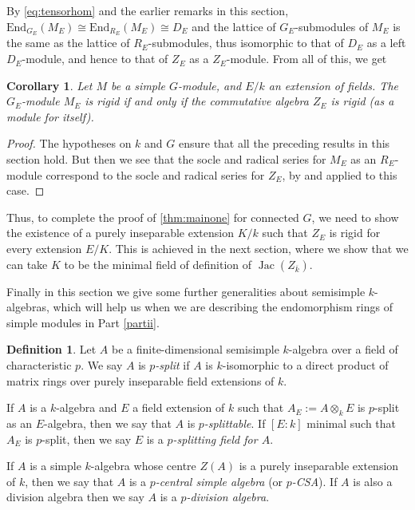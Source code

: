 \documentclass[11pt,reqno]{amsart}
\newtheorem{cor}[lemma]{Corollary}
\theoremstyle{definition}
\theoremstyle{remark}
\theoremstyle{definition}
\newtheorem{defn}[lemma]{Definition}
\theoremstyle{plain}
\DeclareMathOperator{\Jac}{Jac}
\newcommand{\End}{\mathrm{End}}
\newcommand{\bark}{{\overline{k}}}
\begin{document}
By \cref{eq:tensorhom} and the earlier remarks in this section, $\End_{G_E}(M_E)\cong \End_{R_E}(M_E)\cong D_E$ and the lattice of $G_E$-submodules of $M_E$ is the same as the lattice of $R_E$-submodules,  thus isomorphic to that of $D_E$ as a left $D_E$-module, and hence to that of $Z_E$ as a $Z_E$-module.  
From all of this, we get
\begin{cor}\label{cor:GEDE}
Let $M$ be a simple $G$-module, and $E/k$ an extension of fields.
The $G_E$-module $M_E$ is rigid if and only if the commutative algebra $Z_E$ is rigid (as a module for itself). 
\end{cor}

\begin{proof}
The hypotheses on $k$ and $G$ ensure that all the preceding results in this section hold.
But then we see that the socle and radical series for $M_E$ as an $R_E$-module correspond to the socle and radical series for $Z_E$, by  and 
applied to this case.
\end{proof}

Thus, to complete the proof of \cref{thm:mainone} for connected $G$, we need to show the existence of a purely inseparable extension $K/k$ such that $Z_E$ is rigid for every extension $E/K$. 
This is achieved in the next section, where we show that we can take $K$ to be the minimal field of definition of $\Jac(Z_\bark)$.

Finally in this section we give some further generalities about semisimple $k$-algebras, which will help us when we are describing
the endomorphism rings of simple modules in Part \ref{partii}.

\begin{defn}
  Let $A$ be a finite-dimensional semisimple $k$-algebra over a field of characteristic $p$. 
  We say $A$ is \emph{$p$-split} if $A$ is $k$-isomorphic to a direct product of matrix rings over purely inseparable field extensions of $k$.

  If $A$ is a $k$-algebra and $E$ a field extension of $k$ such that $A_E:=A\otimes_kE$ is $p$-split as an $E$-algebra, then we say that $A$ is \emph{$p$-splittable}. 
  If $[E:k]$ minimal such that $A_E$ is $p$-split, then we say $E$ is a \emph{$p$-splitting field for $A$}.

  If $A$ is a simple $k$-algebra whose centre $Z(A)$ is a purely inseparable extension of $k$, then we say that $A$ is a \emph{$p$-central simple algebra} (or \emph{$p$-CSA}). 
  If $A$ is also a division algebra then we say $A$ is a \emph{$p$-division algebra}.
\end{defn}
\end{document}

